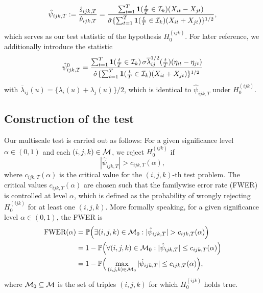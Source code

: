 \documentclass[a4paper,12pt]{article}
\numberwithin{equation}{section}
\begin{document}
\begin{equation}\label{eq:stat}
\hat{\psi}_{ijk,T} := \frac{\hat{s}_{ijk,T}}{\hat{\nu}_{ijk,T}} = \frac{\sum\nolimits_{t=1}^T \boldsymbol{1}(\frac{t}{T} \in \mathcal{I}_k) (X_{it} - X_{jt})}{ \hat{\sigma} \{ \sum\nolimits_{t=1}^T \boldsymbol{1}(\frac{t}{T} \in \mathcal{I}_k) (X_{it} + X_{jt}) \}^{1/2}}, 
\end{equation}
which serves as our test statistic of the hypothesis $H_0^{(ijk)}$. For later reference, we additionally introduce the statistic 
\begin{equation}\label{eq:stat0}
\hat{\psi}_{ijk,T}^0 = \frac{\sum\nolimits_{t=1}^T \boldsymbol{1}(\frac{t}{T} \in \mathcal{I}_k) \, \sigma \overline{\lambda}_{ij}^{1/2}(\frac{t}{T}) (\eta_{it} - \eta_{jt})}{ \hat{\sigma} \{ \sum\nolimits_{t=1}^T \boldsymbol{1}(\frac{t}{T} \in \mathcal{I}_k) (X_{it} + X_{jt}) \}^{1/2}}
\end{equation}
with $\overline{\lambda}_{ij}(u) = \{ \lambda_i(u) + \lambda_j(u) \}/2$, which is identical to $\hat{\psi}_{ijk,T}$ under $H_0^{(ijk)}$. 


\subsection{Construction of the test} 


Our multiscale test is carried out as follows: For a given significance level $\alpha \in (0,1)$ and each $(i,j,k) \in \mathcal{M}$, we reject $H_0^{(ijk)}$ if 
\[ |\hat{\psi}_{ijk,T}| > c_{ijk,T}(\alpha), \]
where $c_{ijk,T}(\alpha)$ is the critical value for the $(i,j,k)$-th test problem. The critical values $c_{ijk,T}(\alpha)$ are chosen such that the familywise error rate (FWER) is controlled at level $\alpha$, which is defined as the probability of wrongly rejecting $H_0^{(ijk)}$ for at least one $(i,j,k)$. More formally speaking, for a given significance level $\alpha \in (0,1)$, the FWER is 
\begin{align*}
\text{FWER}(\alpha) 
 & = \mathbb{P} \Big( \exists (i,j,k) \in \mathcal{M}_0: |\hat{\psi}_{ijk,T}| > c_{ijk,T}(\alpha) \Big) \\
 & =  1 - \mathbb{P} \Big( \forall (i,j,k) \in \mathcal{M}_0: |\hat{\psi}_{ijk,T}| \le c_{ijk,T}(\alpha) \Big) \\
 & = 1 - \mathbb{P}\Big( \max_{(i,j,k) \in \mathcal{M}_0} |\hat{\psi}_{ijk,T}| \le c_{ijk,T}(\alpha) \Big), 
\end{align*}
where $\mathcal{M}_0 \subseteq \mathcal{M}$ is the set of triples $(i,j,k)$ for which $H_0^{(ijk)}$ holds true.  
\end{document}
